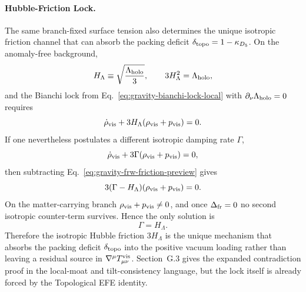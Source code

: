 \documentclass[11pt]{article}
\begin{document}
\paragraph{Hubble-Friction Lock.}
The same branch-fixed surface tension also determines the unique isotropic
friction channel that can absorb the packing deficit
$\delta_{\rm topo}=1-\kappa_{D_5}$. On the anomaly-free background,
\begin{equation}
\label{eq:gravity-hubble-lock-preview}
 H_{\Lambda}
 \equiv
 \sqrt{\frac{\Lambda_{\rm holo}}{3}},
 \qquad
 3H_{\Lambda}^2=\Lambda_{\rm holo},
\end{equation}
and the Bianchi lock from Eq.~\eqref{eq:gravity-bianchi-lock-local} with
$\partial_{\nu}\Lambda_{\rm holo}=0$ requires
\begin{equation}
\label{eq:gravity-frw-friction-preview}
 \dot\rho_{\rm vis}+3H_{\Lambda}(\rho_{\rm vis}+p_{\rm vis})=0.
\end{equation}
If one nevertheless postulates a different isotropic damping rate $\Gamma$,
\begin{equation}
\label{eq:gravity-general-friction-preview}
 \dot\rho_{\rm vis}+3\Gamma(\rho_{\rm vis}+p_{\rm vis})=0,
\end{equation}
then subtracting Eq.~\eqref{eq:gravity-frw-friction-preview} gives
\begin{equation}
\label{eq:gravity-friction-uniqueness-preview}
 3(\Gamma-H_{\Lambda})(\rho_{\rm vis}+p_{\rm vis})=0.
\end{equation}
On the matter-carrying branch $\rho_{\rm vis}+p_{\rm vis}\neq0$, and once
$\Delta_{\rm fr}=0$ no second isotropic counter-term survives. Hence the only
solution is
\begin{equation}
\label{eq:gravity-friction-solution-preview}
 \Gamma=H_{\Lambda}.
\end{equation}
Therefore the isotropic Hubble friction $3H_{\Lambda}$ is the unique mechanism
that absorbs the packing deficit $\delta_{\rm topo}$ into the positive vacuum
loading rather than leaving a residual source in $\nabla^{\mu}T^{\rm vis}_{\mu\nu}$.
Section~G.3 gives the expanded contradiction proof in the local-moat and
tilt-consistency language, but the lock itself is already forced by the
Topological EFE identity.
\end{document}

